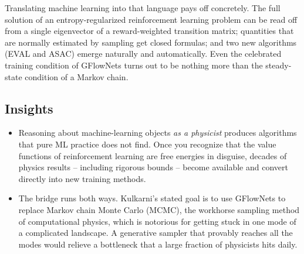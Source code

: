 \documentclass[11pt]{article}
\begin{document}
Translating machine learning into that language pays off concretely. The full solution of an entropy-regularized reinforcement learning problem can be read off from a single eigenvector of a reward-weighted transition matrix; quantities that are normally estimated by sampling get closed formulas; and two new algorithms (EVAL and ASAC) emerge naturally and automatically. Even the celebrated training condition of GFlowNets turns out to be nothing more than the steady-state condition of a Markov chain.

\subsection*{Insights}
\begin{itemize}
    \item Reasoning about machine-learning objects \emph{as a physicist} produces algorithms that pure ML practice does not find. Once you recognize that the value functions of reinforcement learning are free energies in disguise, decades of physics results -- including rigorous bounds -- become available and convert directly into new training methods.
    \item The bridge runs both ways. Kulkarni's stated goal is to use GFlowNets to replace Markov chain Monte Carlo (MCMC), the workhorse sampling method of computational physics, which is notorious for getting stuck in one mode of a complicated landscape. A generative sampler that provably reaches all the modes would relieve a bottleneck that a large fraction of physicists hits daily.
\end{itemize}
\end{document}
